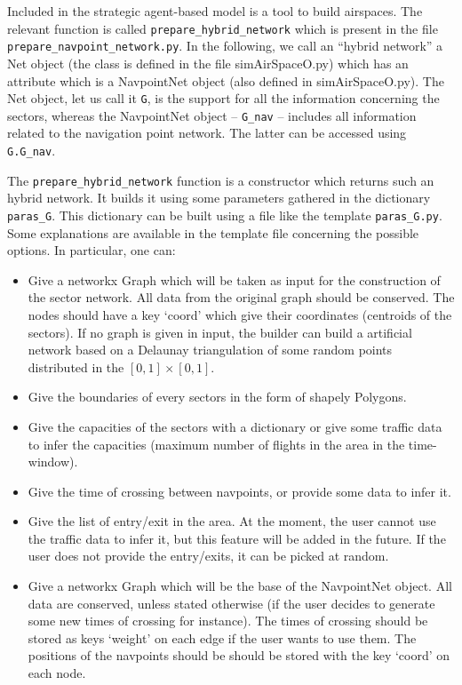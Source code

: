 \documentclass[12pt]{article}
\begin{document}
Included in the strategic agent-based model is a tool to build airspaces. The relevant function is called \verb|prepare_hybrid_network| which is present in the file \verb|prepare_navpoint_network.py|. In the following, we call an ``hybrid network'' a Net object (the class is defined in the file simAirSpaceO.py) which has an attribute which is a NavpointNet object (also defined in simAirSpaceO.py). The Net object, let us call it \verb|G|, is the support for all the information concerning the sectors, whereas the NavpointNet object -- \verb|G_nav| -- includes all information related to the navigation point network. The latter can be accessed using \verb|G.G_nav|.

The \verb|prepare_hybrid_network| function is a constructor which returns such an hybrid network. It builds it using some parameters gathered in the dictionary \verb|paras_G|. This dictionary can be built using a file like the template \verb|paras_G.py|. Some explanations are available in the template file concerning the possible options. In particular, one can:
\begin{itemize}
\item Give a networkx Graph which will be taken as input for the construction of the sector network. All data from the original graph should be conserved. The nodes should have a key `coord' which give their coordinates (centroids of the  sectors). If no graph is given in input, the builder can build a artificial network based on a Delaunay triangulation of some random points distributed in the $[0, 1]\times[0, 1]$.
\item Give the boundaries of every sectors in the form of shapely Polygons.
\item Give the capacities of the sectors with a dictionary or give some traffic data to infer the capacities (maximum number of flights in the area in the time-window).
\item Give the time of crossing between navpoints, or provide some data to infer it.
\item Give the list of entry/exit in the area. At the moment, the user cannot use the traffic data to infer it, but this feature will be added in the future. If the user does not provide the entry/exits, it can be picked at random.
\item Give a networkx Graph which will be the base of the NavpointNet object. All data are conserved, unless stated otherwise (if the user decides to generate some new times of crossing for instance). The times of crossing should be stored as keys `weight' on each edge if the user wants to use them. The positions of the navpoints should be should be stored with the key `coord' on each node.
\end{itemize}
\end{document}
